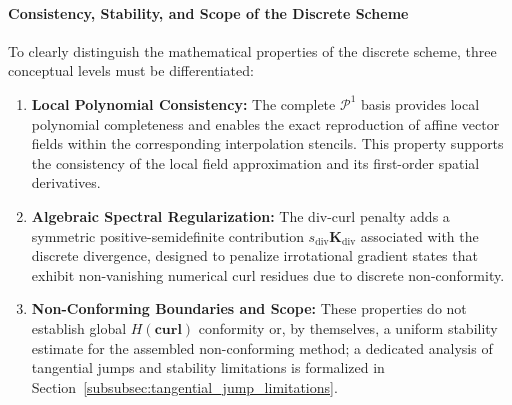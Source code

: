 \documentclass[preprint,12pt]{elsarticle}
\begin{document}
\paragraph{Consistency, Stability, and Scope of the Discrete Scheme}
To clearly distinguish the mathematical properties of the discrete scheme, three conceptual levels must be differentiated:
\begin{enumerate}
    \item \textbf{Local Polynomial Consistency:} The complete $\mathcal{P}^1$ basis provides local polynomial completeness and enables the exact reproduction of affine vector fields within the corresponding interpolation stencils. This property supports the consistency of the local field approximation and its first-order spatial derivatives.
    \item \textbf{Algebraic Spectral Regularization:} The div-curl penalty adds a symmetric positive-semidefinite contribution $s_{\mathrm{div}} \mathbf{K}_{\mathrm{div}}$ associated with the discrete divergence, designed to penalize irrotational gradient states that exhibit non-vanishing numerical curl residues due to discrete non-conformity.
    \item \textbf{Non-Conforming Boundaries and Scope:} These properties do not establish global $H(\mathbf{curl})$ conformity or, by themselves, a uniform stability estimate for the assembled non-conforming method; a dedicated analysis of tangential jumps and stability limitations is formalized in Section~\ref{subsubsec:tangential_jump_limitations}.
\end{enumerate}
\end{document}
